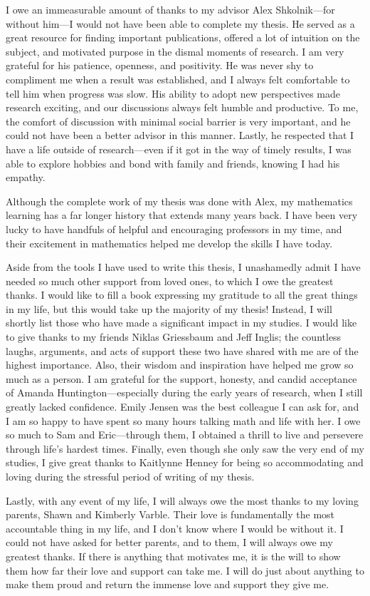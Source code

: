 I owe an immeasurable amount of thanks to my advisor Alex Shkolnik---for without him---I would not have been able to complete my thesis.
He served as a great resource for finding important publications, offered a lot of intuition on the subject, and motivated purpose in the dismal moments of research.
I am very grateful for his patience, openness, and positivity.
He was never shy to compliment me when a result was established, and I always felt comfortable to tell him when progress was slow.
His ability to adopt new perspectives made research exciting, and our discussions always felt humble and productive.
To me, the comfort of discussion with minimal social barrier is very important, and he could not have been a better advisor in this manner.
Lastly, he respected that I have a life outside of research---even if it got in the way of timely results, I was able to explore hobbies and bond with family and friends, knowing I had his empathy.

Although the complete work of my thesis was done with Alex, my mathematics learning has a far longer history that extends many years back.
I have been very lucky to have handfuls of helpful and encouraging professors in my time, and their excitement in mathematics helped me develop the skills I have today.

Aside from the tools I have used to write this thesis, I unashamedly admit I have needed so much other support from loved ones, to which I owe the greatest thanks.
I would like to fill a book expressing my gratitude to all the great things in my life, but this would take up the majority of my thesis!
Instead, I will shortly list those who have made a significant impact in my studies.
I would like to give thanks to my friends Niklas Griessbaum and Jeff Inglis; the countless laughs, arguments, and acts of support these two have shared with me are of the highest importance.
Also, their wisdom and inspiration have helped me grow so much as a person.
I am grateful for the support, honesty, and candid acceptance of Amanda Huntington---especially during the early years of research, when I still greatly lacked confidence.
Emily Jensen was the best colleague I can ask for, and I am so happy to have spent so many hours talking math and life with her.
I owe so much to Sam and Eric---through them, I obtained a thrill to live and persevere through life's hardest times.
Finally, even though she only saw the very end of my studies, I give great thanks to Kaitlynne Henney for being so accommodating and loving during the stressful period of writing of my thesis.

Lastly, with any event of my life, I will always owe the most thanks to my loving parents, Shawn and Kimberly Varble.
Their love is fundamentally the most accountable thing in my life, and I don't know where I would be without it.
I could not have asked for better parents, and to them, I will always owe my greatest thanks.
If there is anything that motivates me, it is the will to show them how far their love and support can take me.
I will do just about anything to make them proud and return the immense love and support they give me.
